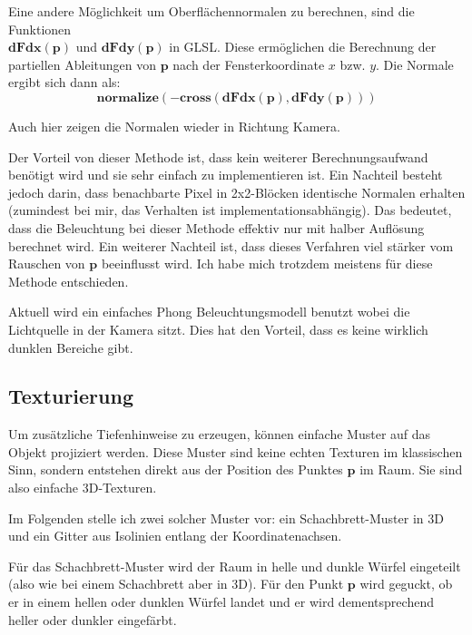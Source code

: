 \documentclass[
	ngerman,%
	accentcolor=9c,%
	ruledheaders=section,%
	class=report,%
	thesis={type=bachelor},%
	fontsize=11pt,%
	parskip=half-,%
	custommargins=true,%
	marginpar=false,%
]{tudapub}
\begin{document}


Eine andere Möglichkeit um Oberflächennormalen zu berechnen, sind die Funktionen \\
\(\mathbf{dFdx}(\mathbf{p})\) und \(\mathbf{dFdy}(\mathbf{p})\) in GLSL. 
Diese ermöglichen die Berechnung der partiellen Ableitungen von \( \mathbf{p} \) nach der Fensterkoordinate \( x \) bzw. \( y \).  
Die Normale ergibt sich dann als:
\[
\mathbf{normalize}(-\mathbf{cross}(\mathbf{dFdx}(\mathbf{p}), \mathbf{dFdy}(\mathbf{p})))
\]

Auch hier zeigen die Normalen wieder in Richtung Kamera.

Der Vorteil von dieser Methode ist, dass kein weiterer Berechnungsaufwand benötigt wird und sie sehr einfach zu implementieren ist. 
Ein Nachteil besteht jedoch darin, dass benachbarte Pixel in 2x2-Blöcken identische Normalen erhalten (zumindest bei mir, das Verhalten ist implementationsabhängig). Das bedeutet, dass die Beleuchtung bei dieser Methode effektiv nur mit halber Auflösung berechnet wird.  
Ein weiterer Nachteil ist, dass dieses Verfahren viel stärker vom Rauschen von \(\mathbf{p}\) beeinflusst wird. Ich habe mich trotzdem meistens für diese Methode entschieden.

Aktuell wird ein einfaches Phong Beleuchtungsmodell benutzt wobei die Lichtquelle in der Kamera sitzt. Dies hat den Vorteil, dass es keine wirklich dunklen Bereiche gibt. 


\subsection{Texturierung}

Um zusätzliche Tiefenhinweise zu erzeugen, können einfache Muster auf das Objekt projiziert werden. Diese Muster sind keine echten Texturen im klassischen Sinn, sondern entstehen direkt aus der Position des Punktes \( \mathbf{p} \) im Raum. Sie sind also einfache 3D-Texturen.  

Im Folgenden stelle ich zwei solcher Muster vor: ein Schachbrett-Muster in 3D und ein Gitter aus Isolinien entlang der Koordinatenachsen.

Für das Schachbrett-Muster wird der Raum in helle und dunkle Würfel eingeteilt (also wie bei einem Schachbrett aber in 3D). Für den Punkt \( \mathbf{p} \) wird geguckt, ob er in einem hellen oder dunklen Würfel landet und er wird dementsprechend heller oder dunkler eingefärbt.
\end{document}
